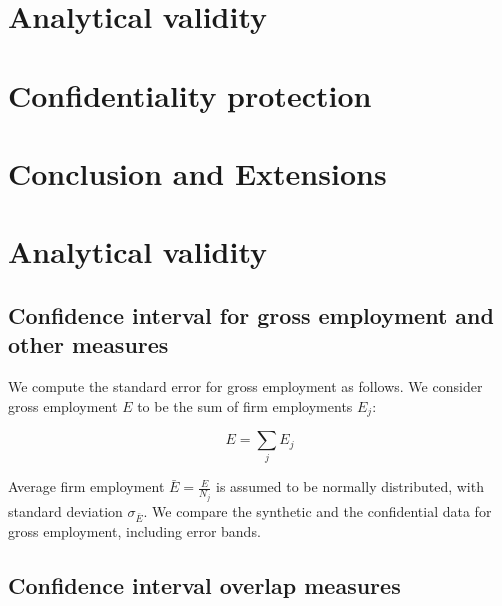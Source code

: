 \documentclass{article}
\begin{document}
\section{Analytical validity}
\label{sec:analytic}


\section{Confidentiality protection}
\label{sec:confidentiality}


\section{Conclusion and Extensions}
\label{sec:conclusion}




\newpage


\section{Analytical validity}

\subsection{Confidence interval for gross employment and other measures}
We compute the standard error for gross employment as follows. We consider gross employment $E$ to be the sum of firm employments $E_j$:

\begin{equation}
E = \sum_j E_j
\end{equation}

Average firm employment $\bar{E} = \frac{E}{N_j}$ is assumed to be normally distributed, with standard deviation $\sigma_{\bar{E}}$. We compare the synthetic and the confidential data for gross employment, including error bands.

\subsection{Confidence interval overlap measures}
\end{document}
